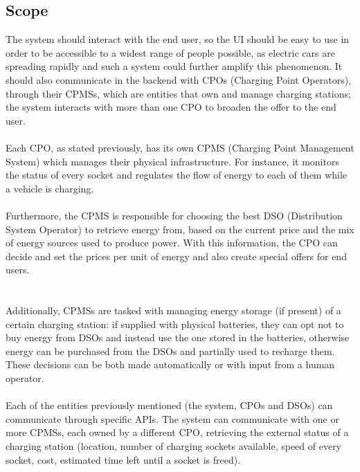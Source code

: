 \subsection{Scope}
The system should interact with the end user, so the UI should be easy to use in order to be accessible to a widest range of people possible, as electric cars are spreading rapidly and such a system could further amplify this phenomenon. It should also communicate in the backend with CPOs (Charging Point Operators), through their CPMSs, which are entities that own and manage charging stations; the system interacts with more than one CPO to broaden the offer to the end user.
\\\\
Each CPO, as stated previously, has its own CPMS (Charging Point Management System) which manages their physical infrastructure. For instance, it monitors the status of every socket and regulates the flow of energy to each of them while a vehicle is charging.
\\\\
Furthermore, the CPMS is responsible for choosing the best DSO (Distribution System Operator) to retrieve energy from, based on the current price and the mix of energy sources used to produce power. With this information, the CPO can decide and set the prices per unit of energy and also create special offers for end users.
\\\\\\
Additionally, CPMSs are tasked with managing energy storage (if present) of a certain charging station: if supplied with physical batteries, they can opt not to buy energy from DSOs and instead use the one stored in the batteries, otherwise energy can be purchased from the DSOs and partially used to recharge them. These decisions can be both made automatically or with input from a human operator.
\\\\
Each of the entities previously mentioned (the system, CPOs and DSOs) can communicate through specific APIs. The system can communicate with one or more CPMSs, each owned by a different CPO, retrieving the external status of a charging station (location, number of charging sockets available, speed of every socket, cost, estimated time left until a socket is freed).

